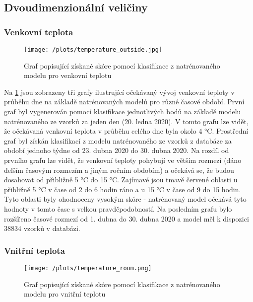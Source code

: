 \subsection*{Dvoudimenzionální veličiny}

\subsubsection*{Venkovní teplota}

\begin{figure}[H]
  \centering
  \texttt{[image: /plots/temperature\_outside.jpg]}
  \caption{Graf popisující získané skóre pomocí klasifikace z natrénovaného modelu pro venkovní teplotu}
  \label{fig:app_temperature_outside}
\end{figure}

Na \cref{fig:app_temperature_outside} jsou zobrazeny tři grafy ilustrující očekávaný vývoj venkovní teploty v průběhu dne na základě natrénovaných modelů pro různé časové období. První graf byl vygenerován pomocí klasifikace jednotlivých bodů na základě modelu natrénovaného ze vzorků za jeden den (20. ledna 2020). V tomto grafu lze vidět, že očekávaná venkovní teplota v průběhu celého dne byla okolo 4 \si{\degree}C. Prostřední graf byl získán klasifikací z modelu natrénovaného ze vzorků z databáze za období jednoho týdne od 23. dubna 2020 do 30. dubna 2020. Na rozdíl od prvního grafu lze vidět, že venkovní teploty pohybují ve větším rozmezí (dáno delším časovým rozmezím a jiným ročním obdobím) a očekává se, že budou dosahovat od přibližně 5 \si{\degree}C do 15  \si{\degree}C. Zajímavé jsou tmavě červené oblasti u přibližně 5  \si{\degree}C v čase od 2 do 6 hodin ráno a u 15  \si{\degree}C v čase od 9 do 15 hodin. Tyto oblasti byly ohodnoceny vysokým skóre - natrénovaný model očekává tyto hodnoty v tomto čase s velkou pravděpodobností. Na posledním grafu bylo rozšířeno časové rozmezí od 1. dubna do 30. dubna 2020 a model měl k dispozici 38834 vzorků v databázi. 

\subsubsection*{Vnitřní teplota}

\begin{figure}[H]
  \centering
  \texttt{[image: /plots/temperature\_room.png]}
  \caption{Graf popisující získané skóre pomocí klasifikace z natrénovaného modelu pro vnitřní teplotu}
  \label{fig:app_temperature_room}
\end{figure}

